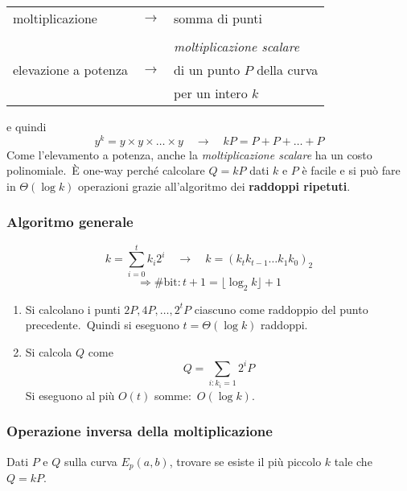 \begin{table}[H]
    \centering
    \begin{tabular}{ l c l }
        moltiplicazione                         & $\rightarrow$ & somma di punti                   \\
                                                &               &                                  \\
        \multirow{3}{9em}{elevazione a potenza} &               & \textit{moltiplicazione scalare} \\
                                                & $\rightarrow$ & di un punto $P$ della curva      \\
                                                &               & per un intero $k$                \\
    \end{tabular}
\end{table}

\noindent e quindi
\[ y^k = y \times y \times \dots \times y \quad \rightarrow \quad kP = P+ P+ \dots + P\]
Come l'elevamento a potenza, anche la \textit{moltiplicazione scalare} ha un costo polinomiale.\
È one-way perché calcolare $Q = kP$ dati $k$ e $P$ è facile e si può fare in $\Theta(\log k)$ operazioni grazie all'algoritmo dei \textbf{raddoppi ripetuti}.\

\subsubsection{Algoritmo generale}

\[ k =\sum_{i=0}^t k_i2^i \quad \rightarrow \quad k= (k_t k_{t-1}\dots k_{1} k_{0})_2\]
\[\Rightarrow \# \mathrm{bit}: t + 1 = \lfloor \log_2 k \rfloor + 1\]
\begin{enumerate}
    \item Si calcolano i punti $2P, 4P,\dots, 2^tP$ ciascuno come raddoppio del punto precedente.\ Quindi si eseguono $t = \Theta(\log k)$ raddoppi.\
    \item Si calcola $Q$ come \[Q = \sum_{i: k_i = 1} 2^iP\] Si eseguono al più $O(t)$ somme:\ $O(\log k)$.\
\end{enumerate}

\subsubsection{Operazione inversa della moltiplicazione}

Dati $P$ e $Q$ sulla curva $E_p(a, b)$, trovare se esiste il più piccolo $k$ tale che $Q = kP$.\

